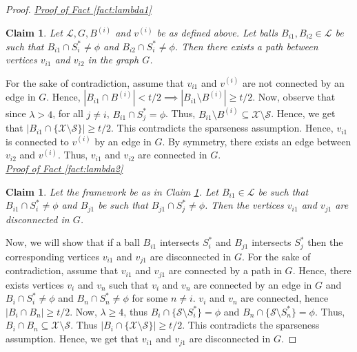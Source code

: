 \documentclass[anon,12pt]{colt2016} %
\newtheorem{claim}[theorem]{Claim}
\newcommand{\mc}{\mathcal}
\begin{document}
\begin{proof}
\noindent\textit{\underline{Proof of Fact \ref{fact:lambda1}}}
\begin{claim}
\label{claim:lambda1}
Let $\mc L, G, B^{(i)}$ and $v^{(i)}$ be as defined above. Let balls $B_{i1}, B_{i2} \in \mc L$ be such that $B_{i1} \cap S_i^* \neq \phi$ and $B_{i2} \cap S_i^* \neq \phi$. Then there exists a path between vertices $v_{i1}$ and $v_{i2}$ in the graph $G$.
\end{claim}
\vspace{-0.1in} For the sake of contradiction, assume that $v_{i1}$ and $v^{(i)}$ are not connected by an edge in $G$. Hence, $|B_{i1} \cap B^{(i)}| < t/2 \implies |B_{i1} \setminus B^{(i)}| \ge t/2$. Now, observe that since $\lambda > 4$, for all $j \neq i$, $B_{i1} \cap S_j^* = \phi$. Thus, $B_{i1} \setminus B^{(i)} \subseteq \mc X \setminus \mc S$. Hence, we get that $|B_{i1} \cap \{\mc X \setminus \mc S\}| \ge t/2$. This contradicts the sparseness assumption. Hence, $v_{i1}$ is connected to $v^{(i)}$ by an edge in $G$. By symmetry, there exists an edge between $v_{i2}$ and $v^{(i)}$. Thus, $v_{i1}$ and $v_{i2}$ are connected in $G$.\\

\noindent\textit{\underline{Proof of Fact \ref{fact:lambda2}}}
\begin{claim}
Let the framework be as in Claim \ref{claim:lambda1}. Let $B_{i1} \in \mc L$ be such that $B_{i1} \cap S_i^* \neq \phi$ and $B_{j1}$ be such that $B_{j1} \cap S_j^* \neq \phi$. Then the vertices $v_{i1}$ and $v_{j1}$ are disconnected in $G$.
\end{claim}
\vspace{-0.1in} Now, we will show that if a ball $B_{i1}$ intersects $S_i^*$ and $B_{j1}$ intersects $S_j^*$ then the corresponding vertices $v_{i1}$ and $v_{j1}$ are disconnected in $G$. For the sake of contradiction, assume that $v_{i1}$ and $v_{j1}$ are connected by a path in $G$. Hence, there exists vertices $v_{i}$ and $v_{n}$ such that $v_i$ and $v_n$ are connected by an edge in $G$ and $B_i \cap S_i^* \neq \phi$ and $B_n \cap S_n^* \neq \phi$ for some $n \neq i$. $v_i$ and $v_n$ are connected, hence $|B_i \cap B_n| \ge t/2$. Now, $\lambda \ge 4$, thus $B_i \cap \{\mc S \setminus S_i^*\} = \phi$ and $B_n \cap \{\mc S\setminus S_n^*\} = \phi$. Thus, $B_i \cap B_n \subseteq \mc X \setminus \mc S$. Thus $|B_{i} \cap \{\mc X \setminus \mc S\}| \ge t/2$. This contradicts the sparseness assumption. Hence, we get that $v_{i1}$ and $v_{j1}$ are disconnected in $G$.
\end{proof}
\end{document}
